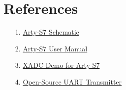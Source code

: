 \documentclass[titlepage]{article}
\begin{document}
\section{References}
\label{references}
\begin{itemize}
    \item[1.] \href{https://digilent.com/reference/_media/reference/programmable-logic/arty-s7/arty_s7_sch-rev_e.pdf?_ga=2.225255450.1624256360.1717423047-1076205636.1717423047}{Arty-S7 Schematic}
    \item[2.] \href{https://docs.rs-online.com/06a7/0900766b815f2fe4.pdf}{Arty-S7 User Manual}
    \item[3.] \href{https://github.com/Digilent/Arty-S7-50-XADC}{XADC Demo for Arty S7}
    \item[4.] \href{https://github.com/ben-marshall/uart}{Open-Source UART Transmitter}
    
\end{itemize}
\end{document}
